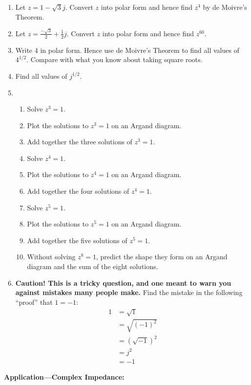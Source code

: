 \documentclass{article}
\begin{document}
\begin{enumerate}
\item Let $z=1-\sqrt{3}j$. Convert $z$ into polar form and hence find $z^4$ by de Moivre's Theorem.
\item Let $z=\frac{-\sqrt{3}}{2}+\frac{1}{2}j$. Convert $z$ into polar form and hence find $z^{60}$.
\item Write 4 in polar form. Hence use de Moivre's Theorem to find all values of $4^{1/2}$. Compare with what you know about taking square roots.
\item Find all values of $j^{1/2}$.
\item
	\begin{enumerate}
	\item Solve $z^3=1$.
	\item Plot the solutions to $z^3=1$ on an Argand diagram.
	\item Add together the three solutions of $z^3=1$.
	\item Solve $z^4=1$.
	\item Plot the solutions to $z^4=1$ on an Argand diagram.
	\item Add together the four solutions of $z^4=1$.
	\item Solve $z^5=1$.
	\item Plot the solutions to $z^5=1$ on an Argand diagram.
	\item Add together the five solutions of $z^5=1$.
	\item Without solving $z^8=1$, predict the shape they form on an Argand diagram and the sum of the eight solutions.
	\end{enumerate}
\item \textbf{Caution! This is a tricky question, and one meant to warn you against mistakes many people make.} Find the mistake in the following ``proof'' that $1=-1$:
	\begin{align*}
	1&=\sqrt{1}\\
	&=\sqrt{(-1)^2}\\
	&=\left(\sqrt{-1}\right)^2\\
	&=j^2\\
	&=-1
	\end{align*}
\end{enumerate}





\clearpage





\textbf{Application---Complex Impedance:}
\end{document}

